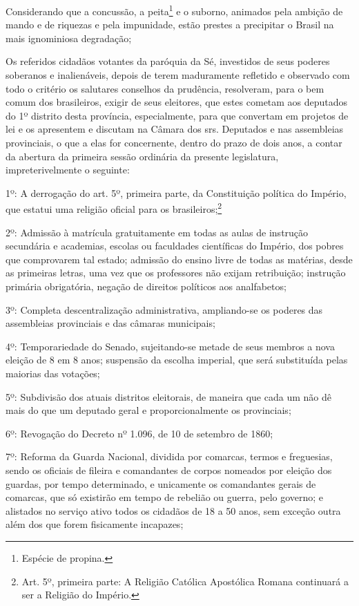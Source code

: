 Considerando que a concussão, a peita\footnote{Espécie de propina.} e
o suborno, animados pela ambição de mando e de riquezas e pela
impunidade, estão prestes a precipitar o Brasil na mais ignominiosa
degradação;

Os referidos cidadãos votantes da paróquia da Sé, investidos de seus
poderes soberanos e inalienáveis, depois de terem maduramente refletido
e observado com todo o critério os salutares conselhos da prudência,
resolveram, para o bem comum dos brasileiros, exigir de seus eleitores,
que estes cometam aos deputados do 1º distrito desta província,
especialmente, para que convertam em projetos de lei e os apresentem e
discutam na Câmara dos srs. Deputados e nas assembleias provinciais, o
que a elas for concernente, dentro do prazo de dois anos, a contar da
abertura da primeira sessão ordinária da presente legislatura,
impreterivelmente o seguinte:

1º: A derrogação do art. 5º, primeira parte, da Constituição política do
Império, que estatui uma religião oficial para os
brasileiros;\footnote{Art. 5º, primeira parte: A Religião Católica
  Apostólica Romana continuará a ser a Religião do Império.}

2º: Admissão à matrícula gratuitamente em todas as aulas de instrução
secundária e academias, escolas ou faculdades científicas do Império,
dos pobres que comprovarem tal estado; admissão do ensino livre de todas
as matérias, desde as primeiras letras, uma vez que os professores não
exijam retribuição; instrução primária obrigatória, negação de direitos
políticos aos analfabetos;

3º: Completa descentralização administrativa, ampliando-se os poderes
das assembleias provinciais e das câmaras municipais;

4º: Temporariedade do Senado, sujeitando-se metade de seus membros a
nova eleição de 8 em 8 anos; suspensão da escolha imperial, que será
substituída pelas maiorias das votações;

5º: Subdivisão dos atuais distritos eleitorais, de maneira que cada um
não dê mais do que um deputado geral e proporcionalmente os provinciais;

6º: Revogação do Decreto nº 1.096, de 10 de setembro de 1860;

7º: Reforma da Guarda Nacional, dividida por comarcas, termos e
freguesias, sendo os oficiais de fileira e comandantes de corpos
nomeados por eleição dos guardas, por tempo determinado, e unicamente os
comandantes gerais de comarcas, que só existirão em tempo de rebelião ou
guerra, pelo governo; e alistados no serviço ativo todos os cidadãos de
18 a 50 anos, sem exceção outra além dos que forem fisicamente
incapazes;

